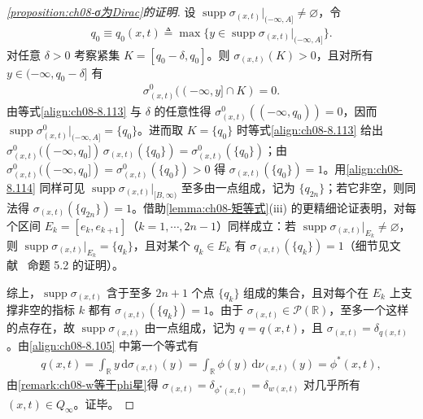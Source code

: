 \documentclass[../../main.tex]{subfiles}%
\begin{document}
\begin{proof}[\cref{proposition:ch08-σ为Dirac}的证明]
设 $\operatorname{supp}\sigma_{(x,t)}|_{(-\infty,A]}\neq\varnothing$，令
\begin{align*}
q_0\equiv q_0(x,t)\triangleq\max\{y\in\operatorname{supp}\sigma_{(x,t)}|_{(-\infty,A]}\}.
\end{align*}
对任意 $\delta>0$ 考察紧集 $K=[q_0-\delta,q_0]$。则 $\sigma_{(x,t)}(K)>0$，且对所有 $y\in(-\infty,q_0-\delta]$ 有
\begin{align*}
\sigma^0_{(x,t)}((-\infty,y]\cap K)=0.
\end{align*}
由等式\eqref{align:ch08-8.113} 与 $\delta$ 的任意性得 $\sigma^0_{(x,t)}((-\infty,q_0))=0$，因而 $\operatorname{supp}\sigma^0_{(x,t)}|_{(-\infty,A]}=\{q_0\}$。进而取 $K=\{q_0\}$ 时等式\eqref{align:ch08-8.113} 给出 $\sigma^0_{(x,t)}((-\infty,q_0])\,\sigma_{(x,t)}(\{q_0\})=\sigma^0_{(x,t)}(\{q_0\})$；由 $\sigma^0_{(x,t)}((-\infty,q_0])=\sigma^0_{(x,t)}(\{q_0\})>0$ 得 $\sigma_{(x,t)}(\{q_0\})=1$。用\eqref{align:ch08-8.114} 同样可见 $\operatorname{supp}\sigma_{(x,t)}|_{[B,\infty)}$ 至多由一点组成，记为 $\{q_{2n}\}$；若它非空，则同法得 $\sigma_{(x,t)}(\{q_{2n}\})=1$。借助\cref{lemma:ch08-矩等式}(iii) 的更精细论证表明，对每个区间 $E_k=[e_k,e_{k+1}]$（$k=1,\cdots ,2n-1$）同样成立：若 $\operatorname{supp}\sigma_{(x,t)}|_{E_k}\neq\varnothing$，则 $\operatorname{supp}\sigma_{(x,t)}|_{E_k}=\{q_k\}$，且对某个 $q_k\in E_k$ 有 $\sigma_{(x,t)}(\{q_k\})=1$（细节见文献~\cite{ref30} 命题 5.2 的证明）。

综上，$\operatorname{supp}\sigma_{(x,t)}$ 含于至多 $2n+1$ 个点 $\{q_k\}$ 组成的集合，且对每个在 $E_k$ 上支撑非空的指标 $k$ 都有 $\sigma_{(x,t)}(\{q_k\})=1$。由于 $\sigma_{(x,t)}\in\mathcal{P}(\mathbb{R})$，至多一个这样的点存在，故 $\operatorname{supp}\sigma_{(x,t)}$ 由一点组成，记为 $q=q(x,t)$，且 $\sigma_{(x,t)}=\delta_{q(x,t)}$。由\eqref{align:ch08-8.105} 中第一个等式有
\begin{align*}
q(x,t)=\int_{\mathbb{R}}y\,\mathrm{d}\sigma_{(x,t)}(y)
=\int_{\mathbb{R}}\phi(y)\,\mathrm{d}\nu_{(x,t)}(y)=\phi^*(x,t),
\end{align*}
由\cref{remark:ch08-w等于phi星}得 $\sigma_{(x,t)}=\delta_{\phi^*(x,t)}=\delta_{w(x,t)}$ 对几乎所有 $(x,t)\in Q_\infty$。证毕。
\end{proof}
\end{document}
